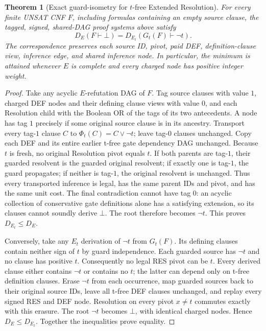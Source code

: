 \documentclass[11pt]{article}
\newtheorem{theorem}{Theorem}
\begin{document}
\begin{theorem}[Exact guard-isometry for $t$-free Extended Resolution]
For every finite UNSAT CNF $F$, including formulas containing an empty
source clause, the tagged, signed, shared-DAG proof systems above satisfy
\[
 \boxed{D_E(F\vdash\bot)=D_{E_t}(G_t(F)\vdash\neg t).}
\]
The correspondence preserves each source ID, pivot, paid DEF,
definition-clause view, inference edge, and shared inference node.
In particular, the minimum is attained whenever $E$ is complete and
every charged node has positive integer weight.
\end{theorem}
\begin{proof}
Take any acyclic $E$-refutation DAG of $F$. Tag source clauses with
value $1$, charged DEF nodes and their defining clause views with
value $0$, and each Resolution child with the Boolean OR of the
tags of its two antecedents. A node has tag $1$ precisely if some
original source clause is in its ancestry. Transport every tag-$1$
clause $C$ to $\Phi_t(C)=C\vee\neg t$; leave tag-$0$ clauses unchanged.
Copy each DEF and its entire earlier t-free gate dependency DAG
unchanged. Because $t$ is fresh, no original Resolution pivot equals
$t$. If both parents are tag-$1$, their guarded resolvent is the
guarded original resolvent; if exactly one is tag-$1$, the guard
propagates; if neither is tag-$1$, the original resolvent is unchanged.
Thus every transported inference is legal, has the same parent IDs
and pivot, and has the same unit cost. The final contradiction cannot
have tag $0$: an acyclic collection of conservative gate definitions
alone has a satisfying extension, so its clauses cannot soundly
derive $\bot$. The root therefore becomes $\neg t$. This proves
$D_{E_t}\le D_E$.

Conversely, take any $E_t$ derivation of $\neg t$ from $G_t(F)$.
Its defining clauses contain neither sign of $t$ by guard
independence. Each guarded source has $\neg t$ and no clause has
positive $t$. Consequently no legal RES pivot can be $t$.
Every derived clause either contains $\neg t$ or contains no $t$;
the latter can depend only on t-free definition clauses.
Erase $\neg t$ from each occurrence, map guarded sources back to
their original source IDs, leave all t-free DEF clauses unchanged,
and replay every signed RES and DEF node. Resolution on every pivot
$x\ne t$ commutes exactly with this erasure. The root $\neg t$
becomes $\bot$, with identical charged nodes. Hence $D_E\le D_{E_t}$.
Together the inequalities prove equality.
\end{proof}
\end{document}
